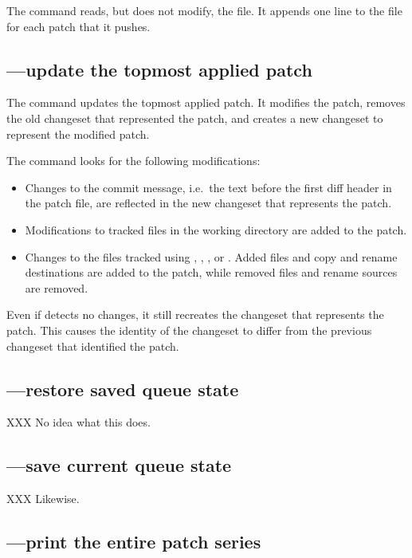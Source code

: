 The  command reads, but does not modify, the
 file.  It appends one line to the 
file for each patch that it pushes.

\subsection{---update the topmost applied patch}

The  command updates the topmost applied patch.  It
modifies the patch, removes the old changeset that represented the
patch, and creates a new changeset to represent the modified patch.

The  command looks for the following modifications:
\begin{itemize}
\item Changes to the commit message, i.e.~the text before the first
  diff header in the patch file, are reflected in the new changeset
  that represents the patch.
\item Modifications to tracked files in the working directory are
  added to the patch.
\item Changes to the files tracked using , ,
  , or .  Added files and copy and rename
  destinations are added to the patch, while removed files and rename
  sources are removed.
\end{itemize}

Even if  detects no changes, it still recreates the
changeset that represents the patch.  This causes the identity of the
changeset to differ from the previous changeset that identified the
patch.

\subsection{---restore saved queue state}

XXX No idea what this does.

\subsection{---save current queue state}

XXX Likewise.

\subsection{---print the entire patch series}

